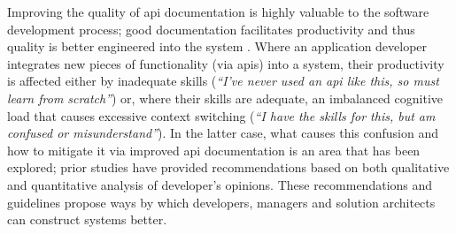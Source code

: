 Improving the quality of \gls{api} documentation is highly valuable to the software development process; good documentation facilitates productivity and thus quality is better engineered into the system \citep{mcleod2011factors}. Where an application developer integrates new pieces of functionality (via \glspl{api}) into a system, their productivity is affected either by inadequate skills (\textit{``I've never used an \gls{api} like this, so must learn from scratch''}) or, where their skills are adequate, an imbalanced cognitive load that causes excessive context switching (\textit{``I have the skills for this, but am confused or misunderstand''}). In the latter case, what causes this confusion and how to mitigate it via improved \gls{api} documentation is an area that has been explored; prior studies have provided recommendations based on both qualitative and quantitative analysis of developer's opinions. These recommendations and guidelines propose ways by which developers, managers and solution architects can construct systems better.

